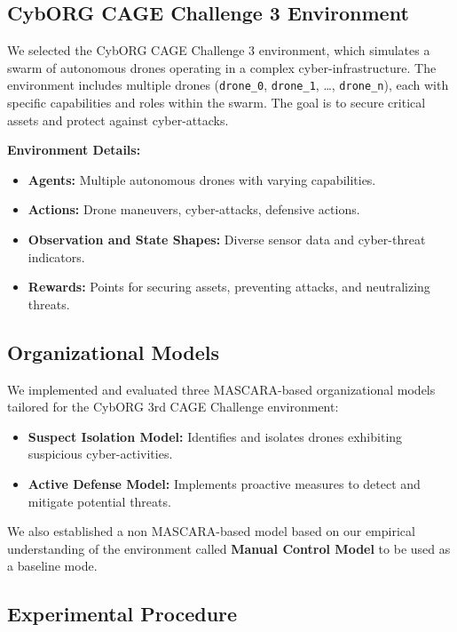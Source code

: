 \documentclass[conference]{IEEEtran}
\begin{document}
\subsection{CybORG CAGE Challenge 3 Environment}

We selected the CybORG CAGE Challenge 3 environment, which simulates a swarm of autonomous drones operating in a complex cyber-infrastructure. The environment includes multiple drones (\texttt{drone\_0}, \texttt{drone\_1}, \ldots, \texttt{drone\_n}), each with specific capabilities and roles within the swarm. The goal is to secure critical assets and protect against cyber-attacks.

\textbf{Environment Details:}
\begin{itemize}
    \item \textbf{Agents:} Multiple autonomous drones with varying capabilities.
    \item \textbf{Actions:} Drone maneuvers, cyber-attacks, defensive actions.
    \item \textbf{Observation and State Shapes:} Diverse sensor data and cyber-threat indicators.
    \item \textbf{Rewards:} Points for securing assets, preventing attacks, and neutralizing threats.
\end{itemize}


\subsection{Organizational Models}

We implemented and evaluated three MASCARA-based organizational models tailored for the CybORG 3rd CAGE Challenge environment:

\begin{itemize}
    \item \textbf{Suspect Isolation Model:} Identifies and isolates drones exhibiting suspicious cyber-activities.
    \item \textbf{Active Defense Model:} Implements proactive measures to detect and mitigate potential threats.
\end{itemize}

We also established a non MASCARA-based model based on our empirical understanding of the environment called \textbf{Manual Control Model} to be used as a baseline mode.



\subsection{Experimental Procedure}
\end{document}
